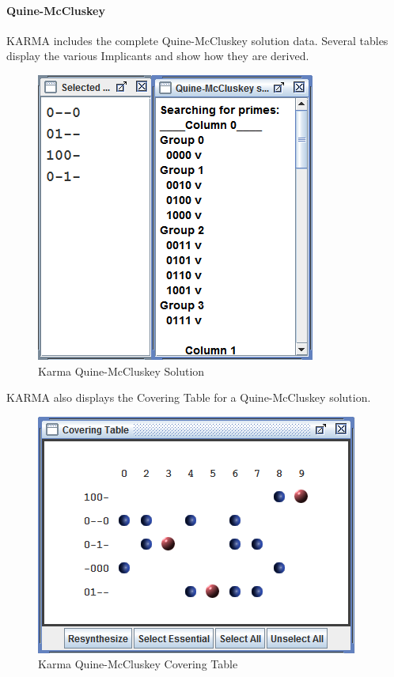 \paragraph{Quine-McCluskey}
\label{ASM:para:quine-mccluskey}

\ac{KARMA} includes the complete Quine-McCluskey solution data. Several tables display the various Implicants and show how they are derived. 

\begin{figure}[H]
	\centering
	\includegraphics[width=\maxwidth{.95\linewidth}]{gfx/07_07}
	\caption{Karma Quine-McCluskey Solution}
	\label{fig:07_07}
\end{figure}

\ac{KARMA} also displays the Covering Table for a Quine-McCluskey solution.

\begin{figure}[H]
	\centering
	\includegraphics[width=\maxwidth{.95\linewidth}]{gfx/07_08}
	\caption{Karma Quine-McCluskey Covering Table}
	\label{fig:07_08}
\end{figure}

